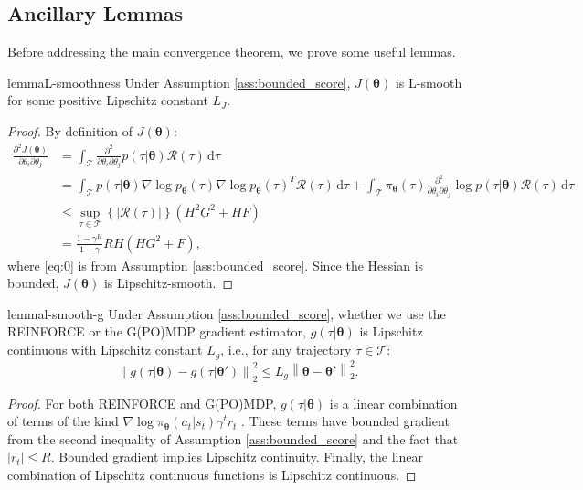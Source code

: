 \documentclass{article}
\makeatletter
\theoremstyle{remark}
\theoremstyle{definition}
\DeclareRobustCommand{\ie}{i.e.,\@\xspace}
\newcommand{\norm}[2][\infty]{\left\|#2\right\|_{#1}}
\newcommand{\Dij}[2]{\frac{\partial^{2}{#1}}{\partial{#2}_i\partial{#2}_j}}
\newcommand{\de}{\,\mathrm{d}}
\newcommand{\vtheta}{\boldsymbol{\theta}}
\newcommand{\Tspace}{\mathcal{T}}
\newcommand{\Reward}{\mathcal{R}}
\newcommand{\pol}{\pi_{\vtheta}}
\newcommand{\score}[2]{\nabla\log p_{#1}(#2)}
\newcommand{\GRADLOG}{G}
\newcommand{\HESSLOG}{F}
\makeatother
\begin{document}
\subsection*{Ancillary Lemmas}
Before addressing the main convergence theorem, we prove some useful lemmas.

 
\begin{restatable}[]{lemma}{L-smoothness}\label{lemma:lsmooth}
	Under Assumption \ref{ass:bounded_score}, $J(\vtheta)$ is L-smooth for some positive Lipschitz constant $L_J$.
\end{restatable}
\begin{proof}
By definition of $J(\vtheta)$:
\begin{align}
\Dij{J(\vtheta)}{\theta} 
&= \int_{\Tspace}\Dij{}{\theta}p(\tau|\vtheta)\Reward(\tau)\de \tau
\nonumber\\ 
&= \int_{\Tspace}p(\tau|\vtheta)\score{\vtheta}{\tau}\score{\vtheta}{\tau}^T\Reward(\tau)\de \tau + \int_{\Tspace}\pol(\tau)\Dij{}{\theta}\log p(\tau|\vtheta)\Reward(\tau)\de \tau \nonumber\\
&\leq \sup_{\tau \in \mathcal{T}} \left\{\left|\Reward(\tau)\right|\right\} \left(H^2\GRADLOG^2+H\HESSLOG\right) \label{eq:0}\\
&= \frac{1-\gamma^H}{1-\gamma}RH\left(H\GRADLOG^2+\HESSLOG\right),\nonumber
\end{align}
where \ref{eq:0} is from Assumption \ref{ass:bounded_score}.
Since the Hessian is bounded, $J(\vtheta)$ is Lipschitz-smooth.
\end{proof}

\begin{restatable}[]{lemma}{l-smooth-g}\label{lemma:gsmooth}
Under Assumption \ref{ass:bounded_score}, whether we use the REINFORCE or the G(PO)MDP gradient estimator, $g(\tau\vert\vtheta)$ is Lipschitz continuous with Lipschitz constant $L_g$, \ie for any trajectory $\tau\in\Tspace$:
\[
	\norm[2]{g(\tau\vert\vtheta)-g(\tau\vert\vtheta')}^2 \leq L_g\norm[2]{\vtheta-\vtheta'}^2.
\]
\end{restatable}
\begin{proof}
        For both REINFORCE and G(PO)MDP, $g(\tau\vert\vtheta)$ is a linear combination of terms of the kind $\nabla \log \pi_{\vtheta}(a_t\vert s_t)\gamma^t r_t$ \cite{peters2008reinforcement}. These terms have bounded gradient from the second inequality of Assumption \ref{ass:bounded_score} and the fact that $|r_t|\leq R$. Bounded gradient implies Lipschitz continuity. Finally, the linear combination of Lipschitz continuous functions is Lipschitz continuous.
\end{proof}
\end{document}
